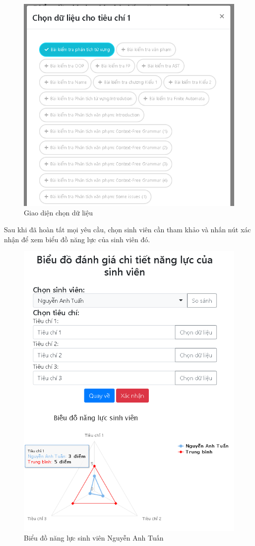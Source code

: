 \begin{center}
	\begin{figure}[htp]
		\begin{center}
			\includegraphics[width=0.5\linewidth]{img/21}
		\end{center}
		\caption{Giao diện chọn dữ liệu}
		\label{refhinh53}
	\end{figure}
\end{center}

\newpage
Sau khi đã hoàn tất mọi yêu cầu, chọn sinh viên cần tham khảo và nhấn nút xác nhận để xem biểu đồ năng lực của sinh viên đó.

\begin{center}
	\begin{figure}[htp]
		\begin{center}
			\includegraphics[width=0.8\linewidth]{img/22}
		\end{center}
		\caption{Biểu đồ năng lực sinh viên Nguyễn Anh Tuấn}
		\label{refhinh54}
	\end{figure}
\end{center}

